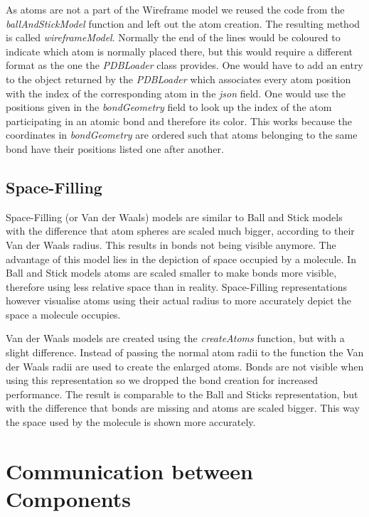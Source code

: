 As atoms are not a part of the Wireframe model we reused the code from the \textit{ballAndStickModel} function and left out the atom creation. The resulting method is called \textit{wireframeModel}. Normally the end of the lines would be coloured to indicate which atom is normally placed there, but this would require a different format as the one the \textit{PDBLoader} class provides. One would have to add an entry to the object returned by the \textit{PDBLoader} which associates every atom position with the index of the corresponding atom in the \textit{json} field. One would use the positions given in the \textit{bondGeometry} field to look up the index of the atom participating in an atomic bond and therefore its color. This works because the coordinates in \textit{bondGeometry} are ordered such that atoms belonging to the same bond have their positions listed one after another.

\subsection{Space-Filling}
\label{sec:implementation:molmodels:vdw}

Space-Filling (or Van der Waals) models are similar to Ball and Stick models with the difference that atom spheres are scaled much bigger, according to their Van der Waals radius. This results in bonds not being visible anymore. The advantage of this model lies in the depiction of space occupied by a molecule. In Ball and Stick models atoms are scaled smaller to make bonds more visible, therefore using less relative space than in reality. Space-Filling representations however visualise atoms using their actual radius to more accurately depict the space a molecule occupies.

Van der Waals models are created using the \textit{createAtoms} function, but with a slight difference. Instead of passing the normal atom radii to the function the Van der Waals radii are used to create the enlarged atoms. Bonds are not visible when using this representation so we dropped the bond creation for increased performance. The result is comparable to the Ball and Sticks representation, but with the difference that bonds are missing and atoms are scaled bigger. This way the space used by the molecule is shown more accurately. 

\section{Communication between Components}
\label{sec:implementation:comm}

